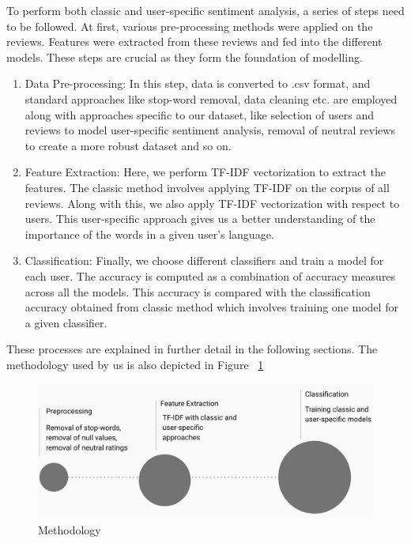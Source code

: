 \documentclass[letterpaper, 10 pt, conference]{ieeeconf}  %
\begin{document}
To perform both classic and user-specific sentiment analysis, a series of steps need to be followed. At first, various pre-processing methods were applied on the reviews. Features were extracted from these reviews and fed into the different models. These steps are crucial as they form the foundation of modelling.\\
\begin{enumerate}
\item {Data Pre-processing:} In this step, data is converted to .csv format, and standard approaches like stop-word removal, data cleaning etc. are employed along with approaches specific to our dataset, like selection of users and reviews to model user-specific sentiment analysis, removal of neutral reviews to create a more robust dataset and so on.\\
\item {Feature Extraction:} Here, we perform TF-IDF vectorization to extract the features. The classic method involves applying TF-IDF on the corpus of all reviews. Along with this, we also apply TF-IDF vectorization with respect to users. This user-specific approach gives us a better understanding of the importance of the words in a given user's language.\\
\item {Classification:} Finally, we choose different classifiers and train a model for each user. The accuracy is computed as a combination of accuracy measures across all the models. This accuracy is compared with the classification accuracy obtained from classic method which involves training one model for a given classifier.\\ 
\end{enumerate}
These processes are explained in further detail in the following sections.
The methodology used by us is also depicted in Figure ~\ref{fig:5}

\begin{figure}[htb]
\includegraphics[width=\linewidth]{img/method.png}
\caption{Methodology}
\label{fig:5}
\end{figure}
\end{document}
